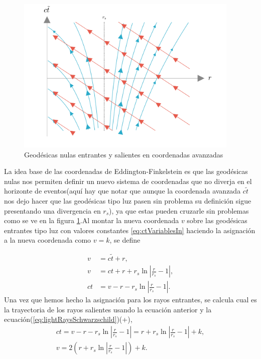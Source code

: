 \begin{figure}[H]
    \begin{small}
        \begin{center}
            \includegraphics[width=0.95\textwidth]{AgujerosNegros/Schwarzschild/media/images/EddingtonFinkelsteinIngoingLight_ManimCE_v0.19.0.png}
        \end{center}
        \caption{Geodésicas nulas entrantes y salientes en coordenadas avanzadas}
        \label{fig:EddingtonFinkelsteinInLight}
    \end{small}
\end{figure}
La idea base de las coordenadas de Eddington-Finkelstein es que las geodésicas nulas nos permiten definir un nuevo sistema de coordenadas que no diverja en el horizonte de eventos(aquí hay que notar que aunque la coordenada avanzada $c\tilde{t}$ nos dejo hacer que las geodésicas tipo luz pasen sin problema su definición sigue presentando una divergencia en $r_s$), ya que estas pueden cruzarle sin problemas como se ve en la figura \ref{fig:EddingtonFinkelsteinInLight}.Al montar la nueva coordenada \( v \) sobre las geodésicas entrantes tipo luz con valores constantes \ref{eq:ctVariablesIn} haciendo la asignación a la nueva coordenada como  $v = k$, se define

\begin{equation}
    \begin{aligned}
        v  & = c\tilde{t} + r ,                                   \\
        v  & = ct + r + r_s \ln \left| \frac{r}{r_s} - 1 \right|, \\
        ct & = v - r - r_s \ln \left| \frac{r}{r_s} - 1 \right|.
    \end{aligned}
\end{equation}
Una vez que hemos hecho la asignación para los rayos entrantes, se calcula cual es la trayectoria de los rayos salientes usando la ecuación anterior y la ecuación(\ref {eq:lightRaysSchwarzschild})(+),
\begin{equation}
    \begin{aligned}
        ct = v - r - r_s \ln \left| \frac{r}{r_s} - 1 \right|= r + r_s \ln \left| \frac{r}{r_s} - 1 \right| + k, \\
        v = 2 \left(r + r_s \ln \left| \frac{r}{r_s} - 1 \right|\right) +k.
    \end{aligned}
\end{equation}

